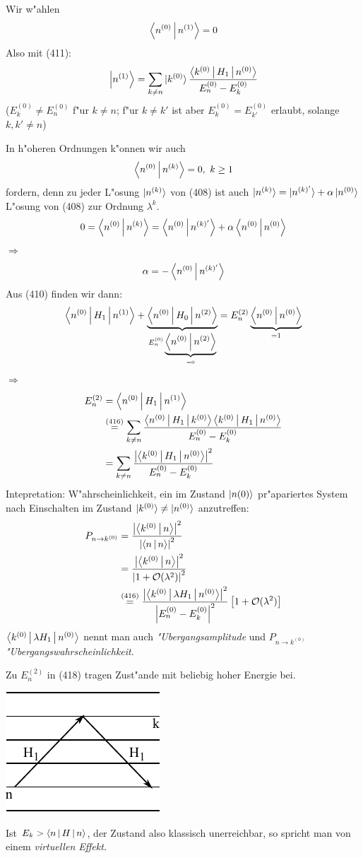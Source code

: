 \documentclass[a4paper]{scrartcl}
\newcommand{\eqn}[1]{\begin{align} #1 \end{align}}
\newcommand{\spl}[1]{\begin{split} #1 \end{split}}
\begin{document}
Wir w"ahlen
\eqn{ \Braket{ n^{(0)} | n^{(1)}} = 0}
Also mit (411):
\eqn{\Ket{ n^{(1)}} = \sum_{k \neq n} \ket{ k^{(0)}} \frac{ \Braket{k^{(0)} | H_1 | n^{(0)}}}{E_n^{(0)} - E_k^{(0)}}}
($E_k^{(0)} \neq E_n^{(0)}$ f"ur $k \neq n$; f"ur $k \neq k'$ ist aber $E_k^{(0)} = E_{k'}^{(0)}$ erlaubt, solange $k, k' \neq n$)

In h"oheren Ordnungen k"onnen wir auch
\eqn{ \Braket{ n^{(0)} | n^{(k)}} = 0, \ k \geq 1}
fordern, denn zu jeder L"osung $\ket{ n^{(k)}}$ von (408) ist auch $\ket{ n^{(k)}} = \ket{n^{(k)'}} + \alpha \ket{ n^{(0)}}$ L"osung von (408) zur Ordnung $\lambda^k$.
$$0 = \Braket{ n^{(0)} | n^{(k)}} = \Braket{ n^{(0)} | n^{(k)'}} + \alpha \Braket{ n^{(0)} | n^{(0)}}$$
$\Longrightarrow$
$$\alpha  = - \Braket{ n^{(0)} | n^{(k)'}}$$
Aus (410) finden wir dann:
$$\Braket{ n^{(0)} | H_1 | n^{(1)}} + \underbrace{ \Braket{ n^{(0)} | H_0 | n^{(2)}}}_{E_n^{(0)} \underbrace{ \Braket{ n^{(0)} | n^{(2)}}}_{=0}} = E_n^{(2)} \underbrace{ \Braket{ n^{(0)} | n^{(0)}}}_{=1}$$
$\Longrightarrow$
\eqn{ \spl{
E_n^{(2)} & = \Braket{ n^{(0)} | H_1 | n^{(1)}} \\
& \stackrel{(416)}= \sum_{k \neq n} \frac{ \Braket{ n^{(0)} | H_1 | k^{(0)}} \Braket{ k^{(0)} | H_1 | n^{(0)}}}{E_n^{(0)} - E_k^{(0)}} \\
& = \sum_{k \neq n} \frac{ \left\vert \Braket{ k^{(0)} | H_1 | n^{(0)}} \right\vert^2}{E_n^{(0)} - E_k^{(0)}}
}}
Intepretation: W"ahrscheinlichkeit, ein im Zustand $\ket{n {(0)}}$ pr"apariertes System nach Einschalten im Zustand $\ket{ k^{(0)}} \neq \ket{n^{(0)}}$ anzutreffen:
\eqn{\spl{
P_{n \rightarrow k^{(0)}} & = \frac{ \left\vert \Braket{ k^{(0)} | n } \right\vert^2}{ \left\vert \Braket{n | n} \right\vert^2 } \\
& = \frac{ \left\vert \Braket{ k^{(0)} | n } \right\vert^2}{\left\vert 1 + \mathcal O(\lambda^2) \right\vert^2} \\
& \stackrel{(416)}= \frac{ \left\vert \Braket{ k^{(0)} | \lambda H_1 | n^{(0)}} \right\vert^2}{\left\vert E_n^{(0)} - E_k^{(0)} \right\vert^2} \left[ 1 + \mathcal O(\lambda^2) \right]
}}
$\Braket{ k^{(0)} | \lambda H_1 | n^{(0)}}$ nennt man auch \emph{"Ubergangsamplitude} und $P_{n \rightarrow k^{(0)}}$ \emph{"Ubergangswahrscheinlichkeit}.

Zu $E_n^{(2)}$ in (418) tragen Zust"ande mit beliebig hoher Energie bei.
\begin{center}
\includegraphics{419Ubergang}
\end{center}
Ist $E_k > \Braket{n | H | n}$, der Zustand also klassisch unerreichbar, so spricht man von einem \emph{virtuellen Effekt.}
\end{document}
